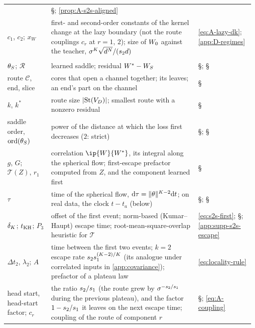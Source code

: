 \begin{xltabular}{\textwidth}{@{}>{\raggedright\arraybackslash}p{3.1cm}X
    >{\raggedright\arraybackslash}p{2.5cm}@{}}
    & \S{}; \cref{prop:A-s2s-aligned} \\
  $c_1$, $c_2$; $x_W$ & first- and second-order constants of the kernel change at the lazy boundary (not
    the route couplings $c_r$ at $r=1$, $2$);
    size of $W_{0}$ against the teacher, $\sigma^K\sqrt{d^N}/(s_{2}d)$ & \eqref{eq:A-lazy-dk};
    \cref{app:D-regimes} \\
  \midrule
   \\
  $\theta_S$; $\mathcal R$ & learned saddle; residual $W^{*}-W_S$ & \S{};
    \S{} \\
  route $\mathcal C$, end, slice & cores that open a channel together; its leaves; an end's part on the
    channel & \S{} \\
  $k$, $k^*$ & route size $\lvert\mathrm{St}(V_D)\rvert$; smallest route with a nonzero residual
    & \S{} \\
  saddle order, $\mathrm{ord}(\theta_S)$ & power of the distance at which the loss first decreases ($2$: strict)
    & \S{}; \S{} \\
  $g$, $G$; $\mathcal{T}(Z)$, $r_1$ & correlation $\ip{\W}{\Wt}$, its integral along the spherical flow;
    first-escape prefactor computed from $Z$, and the component learned first & \S{} \\
  $\tau$ & time of the spherical flow, $\mathrm{d}\tau=\lVert\theta\rVert^{K-2}\mathrm{d} t$; on real data, the clock $t-t_a$
    (below) & \S{}; \S{} \\
  $\delta_K$; $t_{\rm KH}$; $P_3$ & offset of the first event; norm-based (Kumar--Haupt) escape time;
    root-mean-square-overlap heuristic for $\mathcal T$ & \eqref{eq:s2s-first}; \S{};
    \cref{app:supp-s2s-escape} \\
  $\Delta t_2$, $\lambda_2$; $A$ & time between the first two events; $k=2$ escape rate
    $s_{2}s_{1}^{(K-2)/K}$ (its analogue under correlated inputs in \cref{app:covariance}); prefactor of a
    plateau law & \eqref{eq:locality-rule} \\
  head start, head-start factor; $c_r$ & the ratio $s_{2}/s_{1}$ (the route grew by $\sigma^{-s_{2}/s_{1}}$ during
    the previous plateau), and the factor $1-s_{2}/s_{1}$ it leaves on the next escape time; coupling of the
    route of component $r$ & \S{}; \eqref{eq:A-coupling} \\

\end{xltabular}
